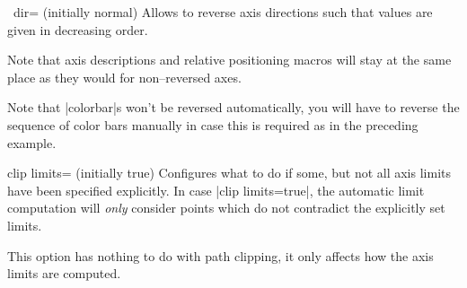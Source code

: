 \begin{pgfplotsxykey}{\x\ dir= (initially normal)}
	Allows to reverse axis directions such that values are given in decreasing order.
\label{key:pgfplots:xydir}
\begin{codeexample}[]
\end{codeexample}

\begin{codeexample}[]
\end{codeexample}

	Note that axis descriptions and relative positioning macros will stay at the same place as they would for non--reversed axes.
\begin{codeexample}[]
\end{codeexample}

	Note that |colorbar|s won't be reversed automatically, you will have to reverse the sequence of color bars manually in case this is required as in the preceding example.
\end{pgfplotsxykey}

\begin{pgfplotskey}{clip limits= (initially true)}
	Configures what to do if some, but not all axis limits have been specified explicitly. In case |clip limits=true|, the automatic limit computation will \emph{only} consider points which do not contradict the explicitly set limits. 

	This option has nothing to do with path clipping, it only affects how the axis limits are computed.
\end{pgfplotskey}


